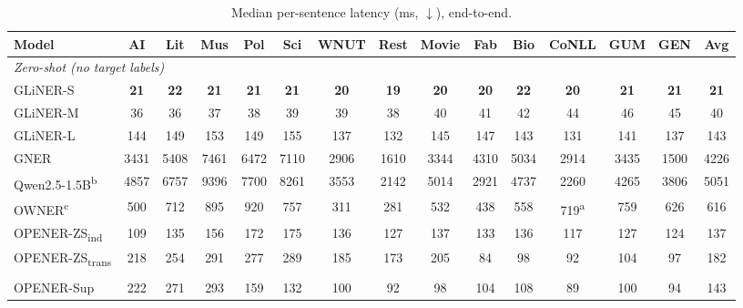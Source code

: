 \documentclass[pdflatex,sn-basic,Numbered]{sn-jnl}
\makeatletter
\newcommand{\zstr}{OPENER-ZS\textsubscript{trans}}
\newcommand{\zsind}{OPENER-ZS\textsubscript{ind}}
\newcommand{\tablecaptype}{\def\@captype{table}}
\makeatother
\begin{document}
\begin{table}[p]
\label{fig:main}
\par\bigskip
\tablecaptype
\centering
\caption{Median per-sentence latency (ms, $\downarrow$), end-to-end.}
\label{tab:latency}
\footnotesize
\setlength{\tabcolsep}{4pt}
\begin{adjustbox}{max width=\textwidth}
\begin{threeparttable}
\begin{tabular}{l*{13}{c}c}
\toprule
Model & AI & Lit & Mus & Pol & Sci & WNUT & Rest & Movie & Fab & Bio & CoNLL & GUM & GEN & Avg \\
\midrule
\multicolumn{15}{l}{\emph{Zero-shot (no target labels)}} \\
GLiNER-S & \textbf{21} & \textbf{22} & \textbf{21} & \textbf{21} & \textbf{21} & \textbf{20} & \textbf{19} & \textbf{20} & \textbf{20} & \textbf{22} & \textbf{20} & \textbf{21} & \textbf{21} & \textbf{21} \\
GLiNER-M & 36 & 36 & 37 & 38 & 39 & 39 & 38 & 40 & 41 & 42 & 44 & 46 & 45 & 40 \\
GLiNER-L & 144 & 149 & 153 & 149 & 155 & 137 & 132 & 145 & 147 & 143 & 131 & 141 & 137 & 143 \\
GNER & 3431 & 5408 & 7461 & 6472 & 7110 & 2906 & 1610 & 3344 & 4310 & 5034 & 2914 & 3435 & 1500 & 4226 \\
Qwen2.5-1.5B\textsuperscript{b} & 4857 & 6757 & 9396 & 7700 & 8261 & 3553 & 2142 & 5014 & 2921 & 4737 & 2260 & 4265 & 3806 & 5051 \\
OWNER\textsuperscript{c} & 500 & 712 & 895 & 920 & 757 & 311 & 281 & 532 & 438 & 558 & 719\textsuperscript{a} & 759 & 626 & 616 \\
\zsind & 109 & 135 & 156 & 172 & 175 & 136 & 127 & 137 & 133 & 136 & 117 & 127 & 124 & 137 \\
\rowcolor{hlyellow} \zstr & 218 & 254 & 291 & 277 & 289 & 185 & 173 & 205 & 84 & 98 & 92 & 104 & 97 & 182 \\
\addlinespace
\multicolumn{15}{l}{\emph{Supervised (target labels)}} \\
\rowcolor{hlred} OPENER-Sup & 222 & 271 & 293 & 159 & 132 & 100 & 92 & 98 & 104 & 108 & 89 & 100 & 94 & 143 \\

\end{tabular}
\end{threeparttable}
\end{adjustbox}
\end{table}
\end{document}
